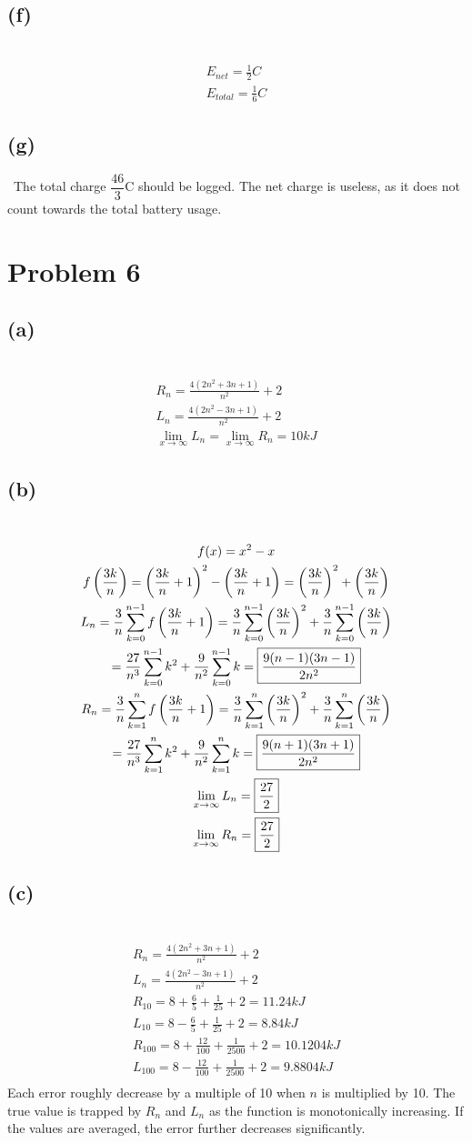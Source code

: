 \documentclass[12pt]{article}
\newcommand*{\paren}[1]{\ensuremath\left(#1\right)}
\newcommand{\problem}[1]{\section{Problem #1}}
\newcommand{\subproblem}[1]{\subsection{(#1)} \,}
\begin{document}
\subproblem{f}
\begin{gather*}
    E_{net}= \frac{1}{2}C\\
    E_{total}=\frac{1}{6}C
\end{gather*}

\subproblem{g}
The total charge $\dfrac{46}{3}$C should be logged. The net charge is useless, as it does not count towards the total battery usage. 

\problem{6}

\subproblem{a}
\begin{gather*}
    R_n=\boxed{\frac{4(2n^2+3n+1)}{n^2}+2}\\
    L_n=\boxed{\frac{4(2n^2-3n+1)}{n^2}+2}\\
    \lim_{x \to \infty} L_n=\lim_{x \to \infty} R_n =\boxed{10kJ}
\end{gather*}

\subproblem{b}
\begin{gather*}
    f(x)=x^2-x\\
    f\paren{\frac{3k}{n}}=\paren{\frac{3k}{n}+1}^2-\paren{\frac{3k}{n}+1}=\paren{\frac{3k}{n}}^2+\paren{\frac{3k}{n}}\\
    L_n=\frac{3}{n} \sum_{k=0}^{n-1} f\paren{\frac{3k}{n}+1}
    =\frac{3}{n} \sum_{k=0}^{n-1} \paren{\frac{3k}{n}}^2+\frac{3}{n}\sum_{k=0}^{n-1}\paren{\frac{3k}{n}}\\
    =\frac{27}{n^3} \sum_{k=0}^{n-1} k^2+\frac{9}{n^2}\sum_{k=0}^{n-1}k
    =\boxed{\frac{9(n-1)(3n-1)}{2n^2}}\\
    R_n=\frac{3}{n} \sum_{k=1}^{n} f\paren{\frac{3k}{n}+1}
    =\frac{3}{n} \sum_{k=1}^{n} \paren{\frac{3k}{n}}^2+\frac{3}{n}\sum_{k=1}^{n}\paren{\frac{3k}{n}}\\
    =\frac{27}{n^3} \sum_{k=1}^{n} k^2+\frac{9}{n^2}\sum_{k=1}^{n}k
    =\boxed{\frac{9(n+1)(3n+1)}{2n^2}}\\
    \lim_{x \to \infty}L_n=\boxed{\frac{27}{2}}\\
    \lim_{x \to \infty}R_n=\boxed{\frac{27}{2}}\\
\end{gather*}

\subproblem{c}
\begin{gather*}
    R_n=\frac{4(2n^2+3n+1)}{n^2}+2\\
    L_n=\frac{4(2n^2-3n+1)}{n^2}+2\\
    R_{10}=8+\frac{6}{5}+\frac{1}{25}+2=\boxed{11.24kJ}\\
    L_{10}=8-\frac{6}{5}+\frac{1}{25}+2=\boxed{8.84kJ}\\
    R_{100}=8+\frac{12}{100}+\frac{1}{2500}+2=\boxed{10.1204kJ}\\
    L_{100}=8-\frac{12}{100}+\frac{1}{2500}+2=\boxed{9.8804kJ}\\
\end{gather*}
Each error roughly decrease by a multiple of 10 when $n$ is multiplied by 10. The true value is trapped by $R_n$ and $L_n$ as the function is monotonically increasing. If the values are averaged, the error further decreases significantly.
\end{document}
